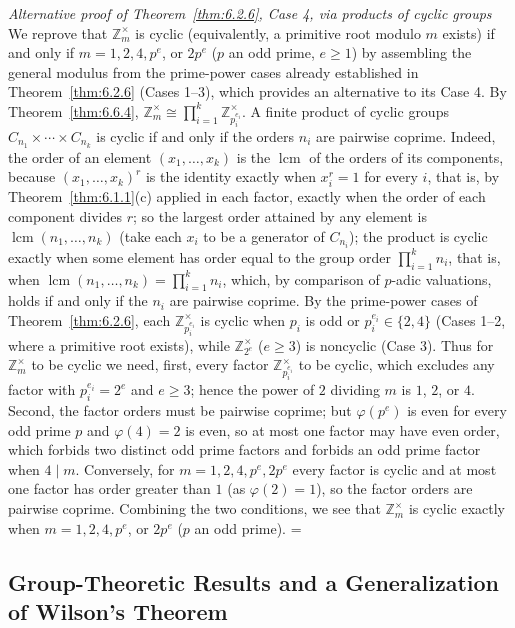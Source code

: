 \documentclass[11pt]{article}
\makeatletter
\theoremstyle{ntstyle}
\let\nt@closedisplay\]
\def\nt@guardedclose{\@ifnextchar\par{\nt@closeafterpar}{\@ifnextchar\end{\postdisplaypenalty\@M\nt@closedisplay}{\nt@closedisplay}}}
\def\nt@closeafterpar\par{\@ifnextchar\par{\nt@closeafterpar}{\@ifnextchar\end{\postdisplaypenalty\@M\nt@closedisplay\par}{\nt@closedisplay\par}}}
\renewenvironment{proof}[1][\proofname]{\par
  \pushQED{\qed}\normalfont\topsep\medskipamount\edef\nt@afterproof{\@endparpenalty=\the\@endparpenalty\relax}\@beginparpenalty\@M\@endparpenalty\@M\let\]\nt@guardedclose\trivlist\item[]\textit{#1\@addpunct{.}} \ignorespaces}{\ifvmode\addpenalty\@M\fi\popQED\nt@afterproof\endtrivlist\@endpefalse}
\newenvironment{altproof}[1][\proofname]{\begin{proof}[#1]}{\end{proof}}
\newcommand{\ZmodUnits}[1]{\mathbb{Z}_{#1}^{\times}}
\DeclareMathOperator{\lcm}{lcm}
\makeatother
\begin{document}
\begin{altproof}[Alternative proof of Theorem~\ref{thm:6.2.6}, Case 4, via products of cyclic groups] We reprove that
	$\ZmodUnits{m}$ is cyclic (equivalently, a primitive root
	modulo $m$ exists) if and only if $m = 1, 2, 4, p^{e}$, or
	$2 p^{e}$ ($p$ an odd prime, $e \ge 1$) by assembling the general
	modulus from the prime-power cases already established in Theorem~\ref{thm:6.2.6} (Cases 1--3),
	which provides an alternative to its Case 4. By
	Theorem~\ref{thm:6.6.4}, $\ZmodUnits{m}
		\cong \prod_{i=1}^{k}\ZmodUnits{p_i^{e_i}}$. A finite product of cyclic groups $C_{n_1} \times \cdots \times
		C_{n_k}$ is cyclic if and only if the orders $n_i$ are pairwise
	coprime. Indeed, the order of an element $(x_1, \ldots, x_k)$ is the
	$\lcm$ of the orders of its components, because
	$(x_1,\ldots,x_k)^r$ is the identity exactly when $x_i^r=1$ for every
	$i$, that is, by Theorem~\ref{thm:6.1.1}(c) applied in each factor, exactly
	when the order of each component divides $r$; so the largest
	order attained by any element is $\lcm(n_1, \ldots, n_k)$ (take each $x_i$ to be a generator of
	$C_{n_i}$); the product is
	cyclic exactly when some element has order equal to the group order
	$\prod_{i=1}^{k}n_i$, that is, when $\lcm(n_1, \ldots, n_k) =
		\prod_{i=1}^{k}n_i$, which, by comparison of $p$-adic valuations, holds if and
	only if the $n_i$ are pairwise coprime. By the prime-power cases of Theorem~\ref{thm:6.2.6}, each
	$\ZmodUnits{p_i^{e_i}}$ is cyclic when $p_i$ is odd or
	$p_i^{e_i} \in \{2, 4\}$ (Cases 1--2, where a primitive root exists),
	while $\ZmodUnits{2^{e}}$ ($e \ge 3$) is noncyclic
	(Case 3). Thus for $\ZmodUnits{m}$ to be cyclic we need,
	first, every factor $\ZmodUnits{p_i^{e_i}}$ to be cyclic,
	which excludes any factor with $p_i^{e_i} = 2^{e}$ and $e \ge 3$; hence
	the power of $2$ dividing $m$ is $1$, $2$, or $4$. Second, the factor
	orders must be pairwise coprime; but $\varphi(p^{e})$ is even for every
	odd prime $p$ and $\varphi(4) = 2$ is even, so at most one factor may
	have even order, which forbids two distinct odd prime factors and
	forbids an odd prime factor when $4 \mid m$. Conversely, for $m = 1, 2, 4, p^{e}, 2p^{e}$ every factor is
	cyclic and at most one factor has order greater than $1$ (as $\varphi(2) = 1$), so the factor orders
	are pairwise coprime. Combining the two
	conditions, we see that $\ZmodUnits{m}$ is cyclic exactly when $m = 1, 2,
		4, p^{e}$, or $2 p^{e}$ ($p$ an odd prime).
\end{altproof}
\subsection{Group-Theoretic Results and a Generalization of Wilson's Theorem}
\end{document}
